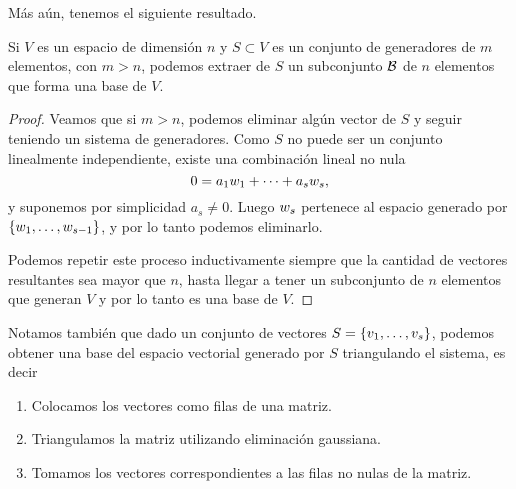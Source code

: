 M\'as a\'un, tenemos el siguiente resultado.

\begin{prop} \label{prop:subbase}
Si $V$ es un espacio de dimensi\'on $n$ y $S \subset V$ es un conjunto de generadores de $m$ elementos, con $m > n$, podemos extraer de $S$ un subconjunto $\mathcal B$ de $n$ elementos que forma una base de $V$.
\end{prop}

\begin{proof}
Veamos que si $m > n$, podemos eliminar alg\'un vector de $S$ y seguir teniendo un sistema de generadores.
Como $S$ no puede ser un conjunto linealmente independiente, existe una combinación lineal no nula
$$
0 = a_1 \wb_1 + \dots + a_s \wb_s,
$$
y suponemos por simplicidad $a_s \neq 0$. Luego $\wb_s$ pertenece al espacio generado por $\{\wb_1, \dots, \wb_{s-1}\}$, y por lo tanto podemos eliminarlo.

Podemos repetir este proceso inductivamente siempre que la cantidad de vectores resultantes sea mayor que $n$, hasta llegar a tener un subconjunto de $n$ elementos que generan $V$ y por lo tanto es una base de $V$.
\end{proof}

Notamos también que dado un conjunto de vectores $S = \{\vb_1, \dots, \vb_s\}$, podemos obtener una base del espacio vectorial generado por $S$ triangulando el sistema, es decir
\begin{enumerate}
\item Colocamos los vectores como filas de una matriz.
\item Triangulamos la matriz utilizando eliminación gaussiana.
\item Tomamos los vectores correspondientes a las filas no nulas de la matriz.
\end{enumerate}

